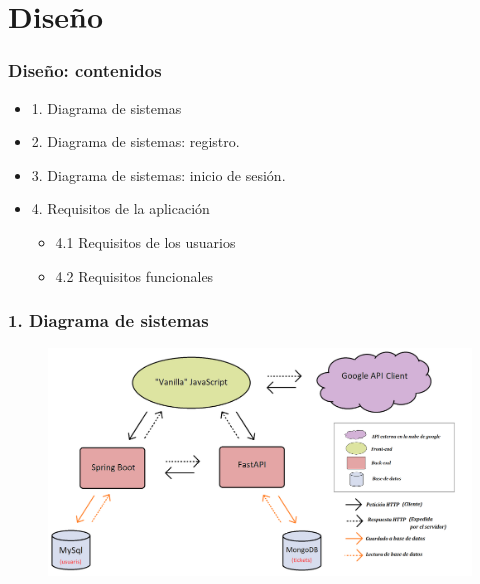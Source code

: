 \documentclass{beamer}
\begin{document}
	
	
	
	
	
	\section{Diseño}
	
	
		\begin{frame}
			\frametitle{\textbf{Diseño}: contenidos}
			\begin{itemize}
				\item 1. Diagrama de sistemas
				\item 2. Diagrama de sistemas: registro. 
				\item 3. Diagrama de sistemas: inicio de sesión.
				\item 4. Requisitos de la aplicación
				\begin{itemize}
					\item 4.1 Requisitos de los usuarios
					\item 4.2 Requisitos funcionales
				\end{itemize}
			\end{itemize}
		\end{frame}
		
		
		
			\begin{frame}
				\frametitle{1. Diagrama de sistemas}
				 
		
				\begin{figure}
					\centering
					\includegraphics[width=1\linewidth]{../img/diagramaSistemesAplicacioMercapp}
					
					\label{fig:diagramasistemesaplicaciomercapp}
				\end{figure}
				
			\end{frame}
			
\end{document}
